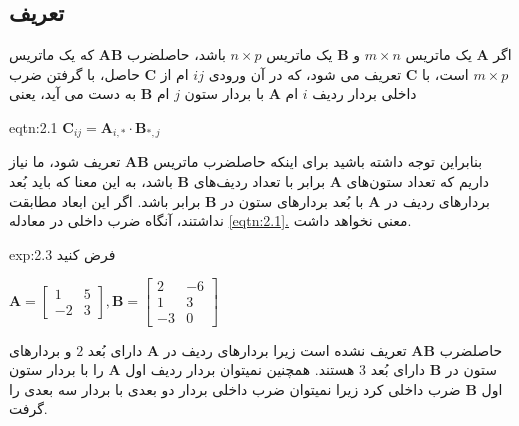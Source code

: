 \subsection{\textbf{تعریف}}
{
    \Large
    \begin{spacing}{1.5}
        اگر $\textbf{A}$ یک ماتریس $m\times n$ و $\textbf{B}$ یک ماتریس $n\times p$ باشد،
        حاصلضرب $\textbf{AB}$ که یک ماتریس $m\times p$ است، با $\textbf{C}$ تعریف می شود،
        که در آن ورودی $ij$ ام از $\textbf{C}$ حاصل، با گرفتن ضرب داخلی بردار ردیف $i$ ام $\textbf{A}$ با بردار ستون $j$ ام $\textbf{B}$ به دست می آید، یعنی

        \begin{eqtn}{eqtn:2.1}
            \centering
            $\textbf{C}_{ij}=\textbf{A}_{i,*}\cdot\textbf{B}_{*,j}$
        \end{eqtn}

        بنابراین توجه داشته باشید برای اینکه حاصلضرب ماتریس $\textbf{AB}$ تعریف شود، ما نیاز داریم که تعداد ستون‌های $\textbf{A}$ برابر با تعداد ردیف‌های $\textbf{B}$ باشد،
        به این معنا که باید بُعد بردارهای ردیف در $\textbf{A}$ با بُعد بردارهای ستون در $\textbf{B}$ برابر باشد.
        اگر این ابعاد مطابقت نداشتند، آنگاه ضرب داخلی در معادله \hyperref[eqtn:2.1]{\ref{eqtn:2.1}.} معنی نخواهد داشت.

        \begin{example}{exp:2.3}
            \Large
            فرض کنید

            \begin{center}
                $\textbf{A}=\begin{bmatrix}
                                1  & 5 \\
                                -2 & 3
                \end{bmatrix}, \textbf{B}=\begin{bmatrix}
                                              2  & -6 \\
                                              1  & 3  \\
                                              -3 & 0
                \end{bmatrix}$
            \end{center}

            حاصلضرب $\textbf{AB}$ تعریف نشده است زیرا بردارهای ردیف در $\textbf{A}$ دارای بُعد $2$ و بردارهای ستون در $\textbf{B}$ دارای بُعد $3$ هستند.
            همچنین نمیتوان بردار ردیف اول $\textbf{A}$ را با بردار ستون اول $\textbf{B}$  ضرب داخلی کرد زیرا نمیتوان ضرب داخلی بردار دو بعدی با بردار سه بعدی را گرفت.
        \end{example}


\end{spacing}}
